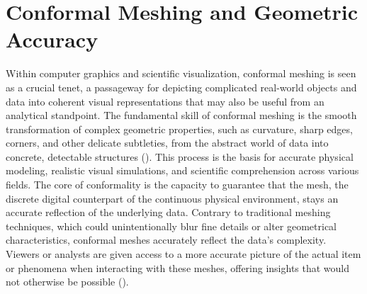 \section{Conformal Meshing and Geometric Accuracy} \label{Section 2.3}
Within computer graphics and scientific visualization, conformal meshing is seen as a crucial tenet, a passageway for depicting complicated real-world objects and data into coherent visual representations that may also be useful from an analytical standpoint. The fundamental skill of conformal meshing is the smooth transformation of complex geometric properties, such as curvature, sharp edges, corners, and other delicate subtleties, from the abstract world of data into concrete, detectable structures (\cite{Benkler_2008}). This process is the basis for accurate physical modeling, realistic visual simulations, and scientific comprehension across various fields. The core of conformality is the capacity to guarantee that the mesh, the discrete digital counterpart of the continuous physical environment, stays an accurate reflection of the underlying data. Contrary to traditional meshing techniques, which could unintentionally blur fine details or alter geometrical characteristics, conformal meshes accurately reflect the data's complexity. Viewers or analysts are given access to a more accurate picture of the actual item or phenomena when interacting with these meshes, offering insights that would not otherwise be possible (\cite{Dai_2007}).

